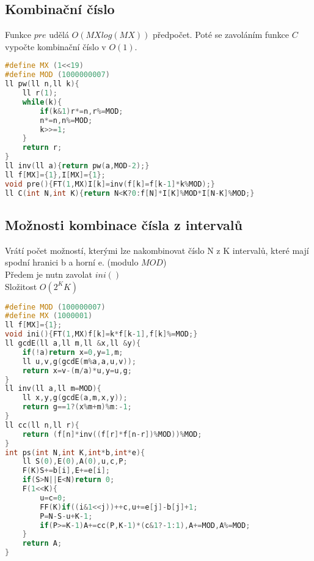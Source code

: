 \documentclass[11pt]{article}
\begin{document}
\subsection{Kombinační číslo}
Funkce $pre$ udělá $O(MXlog(MX))$ předpočet. Poté se zavoláním funkce $C$ vypočte kombinační číslo v $O(1)$.
\begin{lstlisting}[language=C++]
#define MX (1<<19)
#define MOD (1000000007)
ll pw(ll n,ll k){
    ll r(1);
    while(k){
        if(k&1)r*=n,r%=MOD;
        n*=n,n%=MOD;
        k>>=1;
    }
    return r;
}
ll inv(ll a){return pw(a,MOD-2);}
ll f[MX]={1},I[MX]={1};
void pre(){FT(1,MX)I[k]=inv(f[k]=f[k-1]*k%MOD);}
ll C(int N,int K){return N<K?0:f[N]*I[K]%MOD*I[N-K]%MOD;}
\end{lstlisting}
\subsection{Možnosti kombinace čísla z intervalů}
Vrátí počet možností, kterými lze nakombinovat číslo \textsf{N} z \textsf{K} intervalů, které mají spodní hranici \textsf{b} a horní \textsf{e}. (modulo $MOD$)
\\Předem je nutn zavolat $ini()$
\\Složitost $O(2^KK)$
\begin{lstlisting}[language=C++]
#define MOD (100000007)
#define MX (1000001)
ll f[MX]={1};
void ini(){FT(1,MX)f[k]=k*f[k-1],f[k]%=MOD;}
ll gcdE(ll a,ll m,ll &x,ll &y){
    if(!a)return x=0,y=1,m;
    ll u,v,g(gcdE(m%a,a,u,v));
    return x=v-(m/a)*u,y=u,g;
}
ll inv(ll a,ll m=MOD){
    ll x,y,g(gcdE(a,m,x,y));
    return g==1?(x%m+m)%m:-1;
}
ll cc(ll n,ll r){
    return (f[n]*inv((f[r]*f[n-r])%MOD))%MOD;
}
int ps(int N,int K,int*b,int*e){
    ll S(0),E(0),A(0),u,c,P;
    F(K)S+=b[i],E+=e[i];
    if(S>N||E<N)return 0;
    F(1<<K){
        u=c=0;
        FF(K)if((i&1<<j))++c,u+=e[j]-b[j]+1;
        P=N-S-u+K-1;
        if(P>=K-1)A+=cc(P,K-1)*(c&1?-1:1),A+=MOD,A%=MOD;
    }
    return A;
}
\end{lstlisting}
\end{document}
